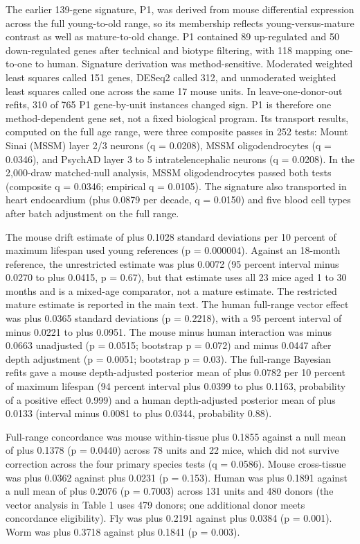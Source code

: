 \documentclass[11pt]{article}
\begin{document}
The earlier 139-gene signature, P1, was derived from mouse differential expression across the full young-to-old range, so its membership reflects young-versus-mature contrast as well as mature-to-old change. P1 contained 89 up-regulated and 50 down-regulated genes after technical and biotype filtering, with 118 mapping one-to-one to human. Signature derivation was method-sensitive. Moderated weighted least squares called 151 genes, DESeq2 called 312, and unmoderated weighted least squares called one across the same 17 mouse units. In leave-one-donor-out refits, 310 of 765 P1 gene-by-unit instances changed sign. P1 is therefore one method-dependent gene set, not a fixed biological program. Its transport results, computed on the full age range, were three composite passes in 252 tests: Mount Sinai (MSSM) layer 2/3 neurons (q = 0.0208), MSSM oligodendrocytes (q = 0.0346), and PsychAD layer 3 to 5 intratelencephalic neurons (q = 0.0208). In the 2,000-draw matched-null analysis, MSSM oligodendrocytes passed both tests (composite q = 0.0346; empirical q = 0.0105). The signature also transported in heart endocardium (plus 0.0879 per decade, q = 0.0150) and five blood cell types after batch adjustment on the full range.

The mouse drift estimate of plus 0.1028 standard deviations per 10 percent of maximum lifespan used young references (p = 0.000004). Against an 18-month reference, the unrestricted estimate was plus 0.0072 (95 percent interval minus 0.0270 to plus 0.0415, p = 0.67), but that estimate uses all 23 mice aged 1 to 30 months and is a mixed-age comparator, not a mature estimate. The restricted mature estimate is reported in the main text. The human full-range vector effect was plus 0.0365 standard deviations (p = 0.2218), with a 95 percent interval of minus 0.0221 to plus 0.0951. The mouse minus human interaction was minus 0.0663 unadjusted (p = 0.0515; bootstrap p = 0.072) and minus 0.0447 after depth adjustment (p = 0.0051; bootstrap p = 0.03). The full-range Bayesian refits gave a mouse depth-adjusted posterior mean of plus 0.0782 per 10 percent of maximum lifespan (94 percent interval plus 0.0399 to plus 0.1163, probability of a positive effect 0.999) and a human depth-adjusted posterior mean of plus 0.0133 (interval minus 0.0081 to plus 0.0344, probability 0.88).

Full-range concordance was mouse within-tissue plus 0.1855 against a null mean of plus 0.1378 (p = 0.0440) across 78 units and 22 mice, which did not survive correction across the four primary species tests (q = 0.0586). Mouse cross-tissue was plus 0.0362 against plus 0.0231 (p = 0.153). Human was plus 0.1891 against a null mean of plus 0.2076 (p = 0.7003) across 131 units and 480 donors (the vector analysis in Table 1 uses 479 donors; one additional donor meets concordance eligibility). Fly was plus 0.2191 against plus 0.0384 (p = 0.001). Worm was plus 0.3718 against plus 0.1841 (p = 0.003).
\end{document}
